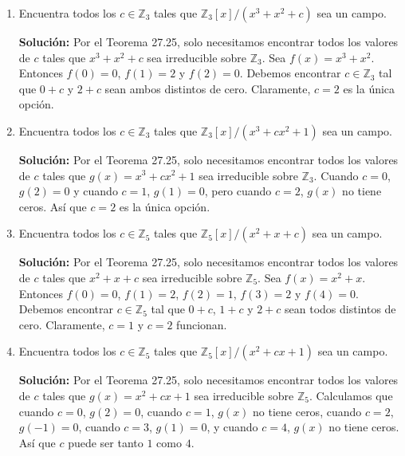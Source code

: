 \begin{enumerate}
\item Encuentra todos los $c \in \mathbb{Z}_3$ tales que $\mathbb{Z}_3[x]/(x^3 + x^2 + c)$ sea un campo.

\textbf{Solución:} Por el Teorema 27.25, solo necesitamos encontrar todos los valores de $c$ tales que $x^3 + x^2 + c$ sea irreducible sobre $\mathbb{Z}_3$. Sea $f(x) = x^3 + x^2$. Entonces $f(0) = 0$, $f(1) = 2$ y $f(2) = 0$. Debemos encontrar $c \in \mathbb{Z}_3$ tal que $0 + c$ y $2 + c$ sean ambos distintos de cero. Claramente, $c = 2$ es la única opción.

\item Encuentra todos los $c \in \mathbb{Z}_3$ tales que $\mathbb{Z}_3[x]/(x^3 + cx^2 + 1)$ sea un campo.

\textbf{Solución:} Por el Teorema 27.25, solo necesitamos encontrar todos los valores de $c$ tales que $g(x) = x^3 + cx^2 + 1$ sea irreducible sobre $\mathbb{Z}_3$. Cuando $c = 0$, $g(2) = 0$ y cuando $c = 1$, $g(1) = 0$, pero cuando $c = 2$, $g(x)$ no tiene ceros. Así que $c = 2$ es la única opción.

\item Encuentra todos los $c \in \mathbb{Z}_5$ tales que $\mathbb{Z}_5[x]/(x^2 + x + c)$ sea un campo.

\textbf{Solución:} Por el Teorema 27.25, solo necesitamos encontrar todos los valores de $c$ tales que $x^2 + x + c$ sea irreducible sobre $\mathbb{Z}_5$. Sea $f(x) = x^2 + x$. Entonces $f(0) = 0$, $f(1) = 2$, $f(2) = 1$, $f(3) = 2$ y $f(4) = 0$. Debemos encontrar $c \in \mathbb{Z}_5$ tal que $0 + c$, $1 + c$ y $2 + c$ sean todos distintos de cero. Claramente, $c = 1$ y $c = 2$ funcionan.

\item Encuentra todos los $c \in \mathbb{Z}_5$ tales que $\mathbb{Z}_5[x]/(x^2 + cx + 1)$ sea un campo.

\textbf{Solución:} Por el Teorema 27.25, solo necesitamos encontrar todos los valores de $c$ tales que $g(x) = x^2 + cx + 1$ sea irreducible sobre $\mathbb{Z}_5$. Calculamos que cuando $c = 0$, $g(2) = 0$, cuando $c = 1$, $g(x)$ no tiene ceros, cuando $c = 2$, $g(-1) = 0$, cuando $c = 3$, $g(1) = 0$, y cuando $c = 4$, $g(x)$ no tiene ceros. Así que $c$ puede ser tanto $1$ como $4$.

\end{enumerate}

